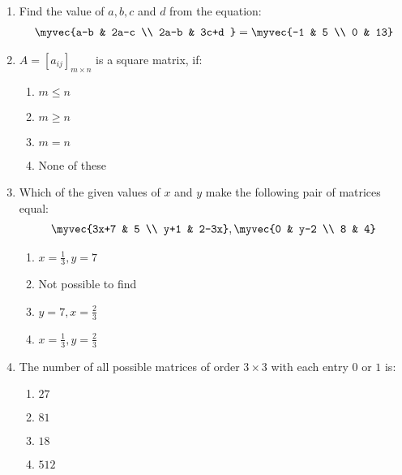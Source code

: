 \begin{enumerate}
\begin{enumerate}[label=(\roman*)]
\end{enumerate}
\item Find the value of $a, b, c$ and $d$ from the equation:
\begin{align} \myvec 
{a-b & 2a-c \\ 2a-b &  3c+d } = 
\myvec{-1 & 5 \\ 0 & 13} \end{align}
\item $A=[a_{ij}]_{m\times n}$ is a square matrix, if:
\begin{enumerate}
\item $m \le n$
\item $m \ge n$
\item $m=n$
\item None of these
\end{enumerate}
\item Which of the given values of $x$ and $y$ make the following pair of matrices equal:
\begin{align} \myvec
{3x+7 & 5 \\ y+1 & 2-3x}, 
\myvec{0 & y-2 \\ 8 & 4}\end{align}
\begin{enumerate}
\item $x=\frac{1}{3}, y=7$
\item Not possible to find 
\item $y=7, x=\frac{2}{3}$
\item $x=\frac{1}{3}, y=\frac{2}{3}$
\end{enumerate}
\item The number of all possible matrices of order $3\times 3$ with each entry $0$ or $1$ is:
\begin{enumerate}
\item $27$
\item $81$
\item $18$
\item $512$
\end{enumerate}
\end{enumerate}

 





